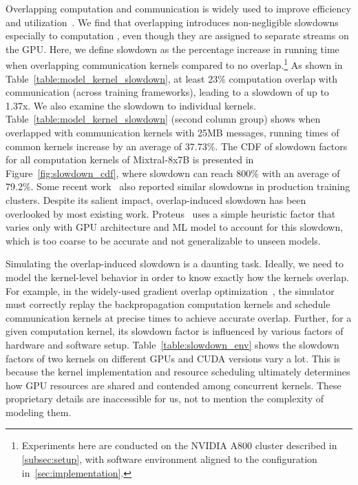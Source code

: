 Overlapping computation and communication is widely used to improve efficiency and utilization~\cite{jiang2024megascale,chen2024centauri,zhang2017poseidon}.
We find that overlapping introduces non-negligible slowdowns especially to computation \ops, even though they are assigned to separate streams on the GPU.
Here, we define slowdown as the percentage increase in running time when overlapping communication kernels compared to no overlap.\footnote{
{Experiments here are conducted on the NVIDIA A800 cluster described in \cref{subsec:setup}, with software environment aligned to the configuration in~\cref{sec:implementation}.}
}
{
As shown in Table~\ref{table:model_kernel_slowdown}, at least 23\% computation \ops overlap with communication (across training frameworks), leading to a slowdown of up to 1.37x.
}
We also examine the slowdown to individual kernels.
Table~\ref{table:model_kernel_slowdown} (second column group) shows when overlapped with communication kernels with 25MB messages, running times of common kernels increase by an average of 37.73\%.
The CDF of slowdown factors for all computation kernels of Mixtral-8x7B is presented in Figure~\ref{fig:slowdown_cdf}, where slowdown can reach 800\% with an average of 79.2\%. 
Some recent work~\cite{hwang2023ark} also reported similar slowdowns in production training clusters. 
Despite its salient impact, overlap-induced slowdown has been overlooked by most existing work.
Proteus~\cite{duan2024proteus} uses a simple heuristic factor that varies only with GPU architecture and ML model to account for this slowdown, which is too coarse to be accurate and not generalizable to unseen models.

Simulating the overlap-induced slowdown is a daunting task. 
Ideally, we need to model the kernel-level behavior in order to know exactly how the kernels overlap.
For example, in the widely-used gradient overlap optimization~\cite{zhang2017poseidon}, the simulator must correctly replay the backpropagation computation kernels and schedule communication kernels at precise times to achieve accurate overlap.
Further, for a given computation kernel, its slowdown factor is influenced by various factors of hardware and software setup. 
Table~\ref{table:slowdown_env} shows the slowdown factors of two kernels on different GPUs and CUDA versions vary a lot.
This is because the kernel implementation and resource scheduling ultimately determines how GPU resources are shared and contended among concurrent kernels.
These proprietary details are inaccessible for us, not to mention the complexity of modeling them.


